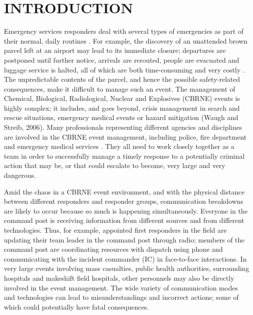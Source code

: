 \documentclass[link]{IWCOMP}
\begin{document}
\section{INTRODUCTION}\label{sec1}\vspace*{5pt}

Emergency services responders deal with several types of emergencies as part
of their normal, daily routines \citep{bib18}. For example, the
discovery of an unattended brown parcel left at an airport may lead to its
immediate closure; departures are postponed until further notice, arrivals
are rerouted, people are evacuated and luggage service is halted, all of
which are both time-consuming and very costly \citep{bib37}.
The unpredictable contents of the parcel, and hence the possible
safety-related consequences, make it difficult to manage such an event. The
management of Chemical, Biological, Radiological, Nuclear and Explosives
(CBRNE) events is highly complex; it includes, and goes beyond, crisis
management in search and rescue situations, emergency medical events or
hazard mitigation (Waugh and Streib, 2006). Many professionals representing
different agencies and disciplines are involved in the CBRNE event
management, including police, fire department and emergency medical services
\citep{bib35}. They all need to work closely together as
a team in order to successfully manage a timely response to a potentially
criminal action that may be, or that could escalate to become, very large
and very dangerous.

Amid the chaos in a CBRNE event environment, and with the physical distance
between different responders and responder groups, communication breakdowns
are likely to occur because so much is happening simultaneously. Everyone in
the command post is receiving information from different sources and from
different technologies. Thus, for example, appointed first responders in the
field are updating their team leader in the command post through radio;
members of the command post are coordinating resources with dispatch using
phone and communicating with the incident commander (IC) in face-to-face
interactions. In very large events involving mass casualties, public health
authorities, surrounding hospitals and makeshift field hospitals, other
personnels may also be directly involved in the event management. The wide
variety of communication modes and technologies can lead to
misunderstandings and incorrect actions; some of which could potentially
have fatal consequences.
\end{document}
